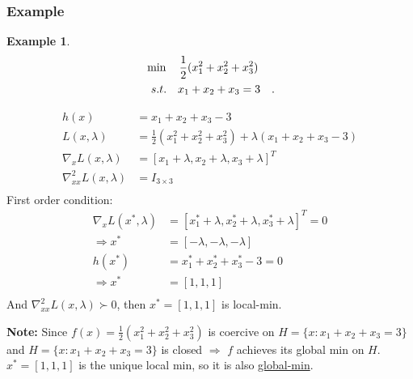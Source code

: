\documentclass[11pt,a4paper]{article}
\newtheorem{example}{Example}
\begin{document}
\subsubsection{Example}
\begin{example}
    \begin{align*}
        &\min\quad \frac{1}{2}(x_1^2+x_2^2+x_3^2)\\
        &\begin{array}{r@{\quad}r@{}l@{\quad}l}
        s.t.
        &x_1+x_2+x_3=3&\\
    \end{array} .
    \end{align*}
\end{example}
\begin{equation}
    \begin{aligned}
        h(x)&=x_1+x_2+x_3-3\\
        L(x,\lambda)&=\frac{1}{2}(x_1^2+x_2^2+x_3^2)+\lambda(x_1+x_2+x_3-3)\\
        \nabla_x L(x,\lambda)&=\left[x_1+\lambda,x_2+\lambda,x_3+\lambda\right]^T\\
        \nabla_{xx}^2 L(x,\lambda)&=I_{3\times 3}\\
    \end{aligned}
    \nonumber
\end{equation}
First order condition:
\begin{equation}
    \begin{aligned}
        \nabla_x L(x^*,\lambda)&=\left[x^*_1+\lambda,x^*_2+\lambda,x^*_3+\lambda\right]^T=0\\
        \Rightarrow	x^*&= [-\lambda,-\lambda,-\lambda]\\
        h(x^*)&=x^*_1+x^*_2+x^*_3-3=0\\
        \Rightarrow	x^*&= [1,1,1]\\
    \end{aligned}
    \nonumber
\end{equation}
And $\nabla_{xx}^2 L(x,\lambda)\succ 0$, then $x^*= [1,1,1]$ is local-min.

\textbf{Note:} Since $f(x)=\frac{1}{2}(x_1^2+x_2^2+x_3^2)$ is coercive on $H=\{x:x_1+x_2+x_3=3\}$ and $H=\{x:x_1+x_2+x_3=3\}$ is closed $\Rightarrow$ $f$ achieves its global min on $H$. $x^*= [1,1,1]$ is the unique local min, so it is also \underline{global-min}.
\end{document}
